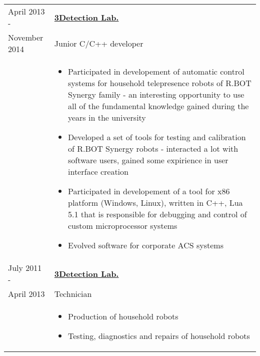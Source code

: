 \documentclass[a4paper, 11pt]{article}
\begin{document}
\begin{longtable}{p{25mm}|p{110mm}}
    \pagebreak[4]
    April 2013 -        & \textbf{\href{http://www.3detection.ru/}{3Detection Lab.}}\\
    November 2014       & Junior C/C++ developer                                    \\
                        &
    \begin{itemize}
        \item   Participated in developement of automatic control systems for
                household telepresence robots of R.BOT Synergy family - an
                interesting opportunity to use all of the fundamental knowledge
                gained during the years in the university
        \item   Developed a set of tools for testing and calibration of
                R.BOT Synergy robots - interacted a lot with
                software users, gained some expirience in user interface creation
        \item   Participated in developement of a tool for x86 platform (Windows,
                Linux), written in C++, Lua 5.1 that is responsible for debugging
                and control of custom microprocessor systems
        \item   Evolved software for corporate ACS systems
    \end{itemize}                                                                   \\

    \pagebreak[3]
    July 2011 - & \textbf{\href{http://www.3detection.ru/}{3Detection Lab.}}        \\
    April 2013  & Technician                                                        \\
                &
    \begin{itemize}
        \item   Production of household robots
        \item   Testing, diagnostics and repairs of household robots
    \end{itemize}                                                                   \\
\end{longtable}
\end{document}
